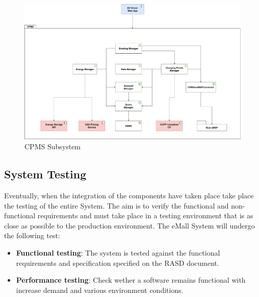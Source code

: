 \begin{figure}[H]
    \centering
    \hspace*{-2cm}
    \includegraphics[scale=0.41]{src/Integration/CPMS_Overview.pdf}
    \caption{CPMS Subsystem}
\end{figure}



\subsection{System Testing}
Eventually, when the integration of the components have taken place take place the testing of the entire System. 
The aim is to verify the functional and non-functional requirements and must take place in a testing
environment that is as close as possible to the production environment. 
The eMall System will undergo the following test:
\begin{itemize}
    \item \textbf{Functional testing}: The system is tested against the functional requirements and specification 
    specified on the RASD document.
    \item \textbf{Performance testing}: Check wether a software remains functional with increase demand and 
    various environment conditions.
\end{itemize}

